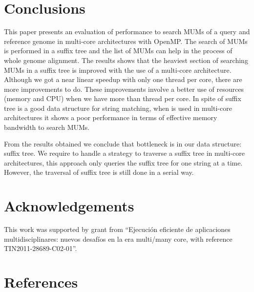 \documentclass[conference]{IEEEtran}
\begin{document}
\section{Conclusions}
This paper presents an evaluation of performance to search MUMs of a query and reference genome in multi-core architectures with OpenMP. The search of MUMs is performed in a suffix tree and the list of MUMs can help in the process of whole genome alignment. The results shows that the heaviest section of searching MUMs in a suffix tree is improved with the use of a multi-core architecture. Although we got a near linear speedup with only one thread per core, there are more improvements to do. These improvements involve a better use of resources (memory and CPU) when we have more than thread per core. In spite of suffix tree is a good data structure for string matching, when is used in multi-core architectures it shows a poor performance in terms of effective memory bandwidth to search MUMs.

From the results obtained we conclude that bottleneck is in our data structure: suffix tree. We require to handle a strategy to traverse a suffix tree in multi-core architectures, this approach only queries the suffix tree for one string at a time. However, the traversal of suffix tree is still done in a serial way.

\section*{Acknowledgements}
This work was supported by grant from ``Ejecuci\'on eficiente de aplicaciones multidisciplinares: nuevos desaf\'ios en la era multi/many core, with reference TIN2011-28689-C02-01''.

\section*{References}


\end{document}

